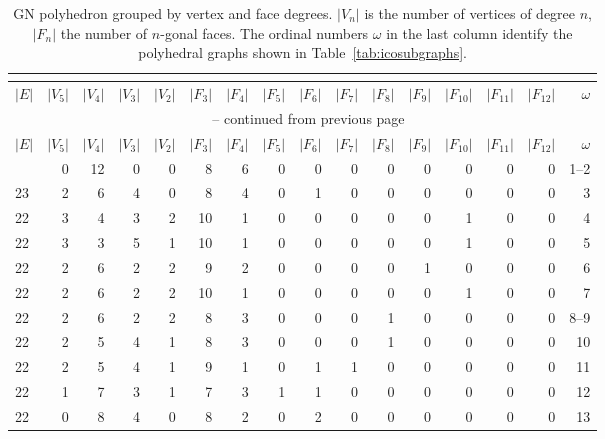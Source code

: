 \footnotesize{\begin{longtable}{l@{\hskip 4pt}r@{\hskip 4pt}r@{\hskip 4pt}r@{\hskip 4pt}r@{\hskip 4pt}r@{\hskip 4pt}r@{\hskip 4pt}r@{\hskip 4pt}r@{\hskip 4pt}r@{\hskip 4pt}r@{\hskip 4pt}r@{\hskip 4pt}r@{\hskip 4pt}r@{\hskip 4pt}r@{\hskip 8pt}r}
    \caption{GN polyhedron grouped by vertex and face degrees. $|V_n|$ is the
    number of vertices of degree $n$, $|F_n|$ the number of $n$-gonal faces.
    The ordinal numbers $\omega$ in the last column identify the polyhedral
    graphs shown in Table~\ref{tab:icosubgraphs}.}\\
    \label{tab:verticesandfaces}\\
\toprule    
    $|E|$ & $|V_5|$ & $|V_4|$ & $|V_3|$ & $|V_2|$ & $|F_3|$ & $|F_4|$ & $|F_5|$ & $|F_6|$ & $|F_7|$ & $|F_8|$ & $|F_9|$ & $|F_{10}|$ & $|F_{11}|$ & $|F_{12}|$ & $\omega$ \\\midrule
\endfirsthead
\multicolumn{16}{c}{\tablename~\thetable{} -- continued from previous page}\\
\toprule
    $|E|$ & $|V_5|$ & $|V_4|$ & $|V_3|$ & $|V_2|$ & $|F_3|$ & $|F_4|$ & $|F_5|$ & $|F_6|$ & $|F_7|$ & $|F_8|$ & $|F_9|$ & $|F_{10}|$ & $|F_{11}|$ & $|F_{12}|$ & $\omega$ \\\midrule
\endhead
\bottomrule\endfoot
    24 & 0  & 12 & 0  & 0  & 8  & 6  & 0  & 0  & 0  & 0  & 0  & 0  & 0  & 0  & 1--2\\
    23 & 2  & 6  & 4  & 0  & 8  & 4  & 0  & 1  & 0  & 0  & 0  & 0  & 0  & 0  & 3  \\
    22 & 3  & 4  & 3  & 2  & 10 & 1  & 0  & 0  & 0  & 0  & 0  & 1  & 0  & 0  & 4  \\
    22 & 3  & 3  & 5  & 1  & 10 & 1  & 0  & 0  & 0  & 0  & 0  & 1  & 0  & 0  & 5  \\
    22 & 2  & 6  & 2  & 2  & 9  & 2  & 0  & 0  & 0  & 0  & 1  & 0  & 0  & 0  & 6  \\
    22 & 2  & 6  & 2  & 2  & 10 & 1  & 0  & 0  & 0  & 0  & 0  & 1  & 0  & 0  & 7  \\
    22 & 2  & 6  & 2  & 2  & 8  & 3  & 0  & 0  & 0  & 1  & 0  & 0  & 0  & 0  & 8--9\\
    22 & 2  & 5  & 4  & 1  & 8  & 3  & 0  & 0  & 0  & 1  & 0  & 0  & 0  & 0  & 10 \\
    22 & 2  & 5  & 4  & 1  & 9  & 1  & 0  & 1  & 1  & 0  & 0  & 0  & 0  & 0  & 11\\
    22 & 1  & 7  & 3  & 1  & 7  & 3  & 1  & 1  & 0  & 0  & 0  & 0  & 0  & 0  & 12 \\
    22 & 0  & 8  & 4  & 0  & 8  & 2  & 0  & 2  & 0  & 0  & 0  & 0  & 0  & 0  & 13\\

\end{longtable}}
